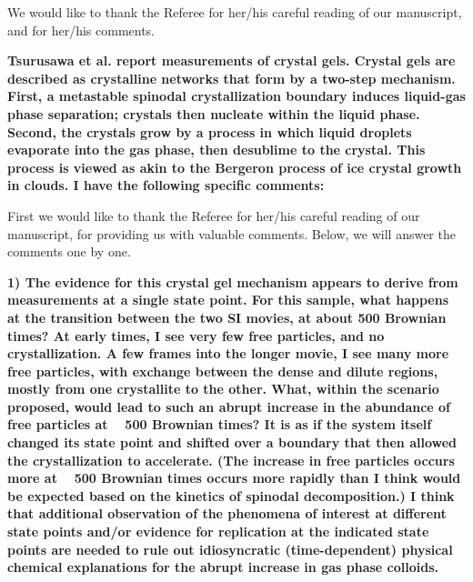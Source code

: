 \documentclass[11pt]{article}
\begin{document}
We would like to thank the Referee for her/his careful reading of our
manuscript, and for her/his comments.

\vspace{1em}

\singlespacing

{\bf
Tsurusawa et al. report measurements of crystal gels. Crystal gels are described as crystalline networks that form by a two-step mechanism. First, a metastable spinodal crystallization boundary induces liquid-gas phase separation; crystals then nucleate within the liquid phase. Second, the crystals grow by a process in which liquid droplets evaporate into the gas phase, then desublime to the crystal. This process is viewed as akin to the Bergeron process of ice crystal growth in clouds. I have the following specific comments:
}



\bigskip
\doublespacing


First we would like to thank the Referee for her/his careful reading of our manuscript, for providing us with valuable comments. Below, we will answer the comments one by one. 


\vspace{1em}

\singlespacing

{\bf
1) The evidence for this crystal gel mechanism appears to derive from measurements at a single state point. For this sample, what happens at the transition between the two SI movies, at about 500 Brownian times? At early times, I see very few free particles, and no crystallization. A few frames into the longer movie, I see many more free particles, with exchange between the dense and dilute regions, mostly from one crystallite to the other. What, within the scenario proposed, would lead to such an abrupt increase in the abundance of free particles at ~ 500 Brownian times? It is as if the system itself changed its state point and shifted over a boundary that then allowed the crystallization to accelerate. (The increase in free particles occurs more at ~ 500 Brownian times occurs more rapidly than I think would be expected based on the kinetics of spinodal decomposition.) I think that additional observation of the phenomena of interest at different state points and/or evidence for replication at the indicated 
state points are needed to rule out idiosyncratic (time-dependent) physical chemical explanations for the abrupt increase in gas phase colloids.
}
\end{document}
